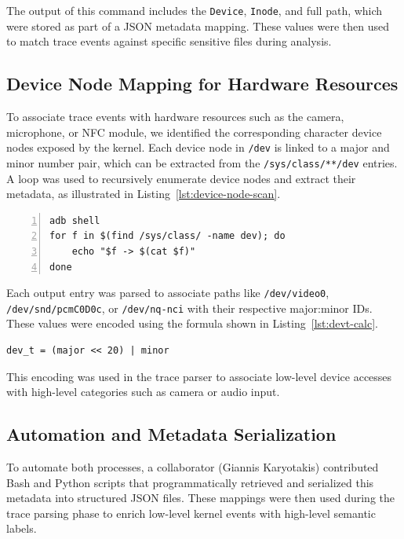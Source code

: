 \documentclass[a4paper,12pt]{report}
\begin{document}
The output of this command includes the \texttt{Device}, \texttt{Inode}, and full path, which were stored as part of a JSON metadata mapping. These values were then used to match trace events against specific sensitive files during analysis.

\subsection{Device Node Mapping for Hardware Resources}

To associate trace events with hardware resources such as the camera, microphone, or NFC module, we identified the corresponding character device nodes exposed by the kernel. Each device node in \texttt{/dev} is linked to a major and minor number pair, which can be extracted from the \texttt{/sys/class/**/dev} entries. A loop was used to recursively enumerate device nodes and extract their metadata, as illustrated in Listing~\ref{lst:device-node-scan}.

\begin{lstlisting}[caption={Enumerating character and block devices with major:minor IDs},label={lst:device-node-scan},numbers=left]
adb shell
for f in $(find /sys/class/ -name dev); do
    echo "$f -> $(cat $f)"
done
\end{lstlisting}

Each output entry was parsed to associate paths like \texttt{/dev/video0}, \texttt{/dev/snd/pcmC0D0c}, or \texttt{/dev/nq-nci} with their respective major:minor IDs. These values were encoded using the formula shown in Listing~\ref{lst:devt-calc}.

\begin{lstlisting}[caption={Encoding device number using major and minor},label={lst:devt-calc},numbers=none]
dev_t = (major << 20) | minor
\end{lstlisting}

This encoding was used in the trace parser to associate low-level device accesses with high-level categories such as camera or audio input.

\subsection{Automation and Metadata Serialization}

To automate both processes, a collaborator (Giannis Karyotakis) contributed Bash and Python scripts that programmatically retrieved and serialized this metadata into structured JSON files. These mappings were then used during the trace parsing phase to enrich low-level kernel events with high-level semantic labels.
\end{document}
